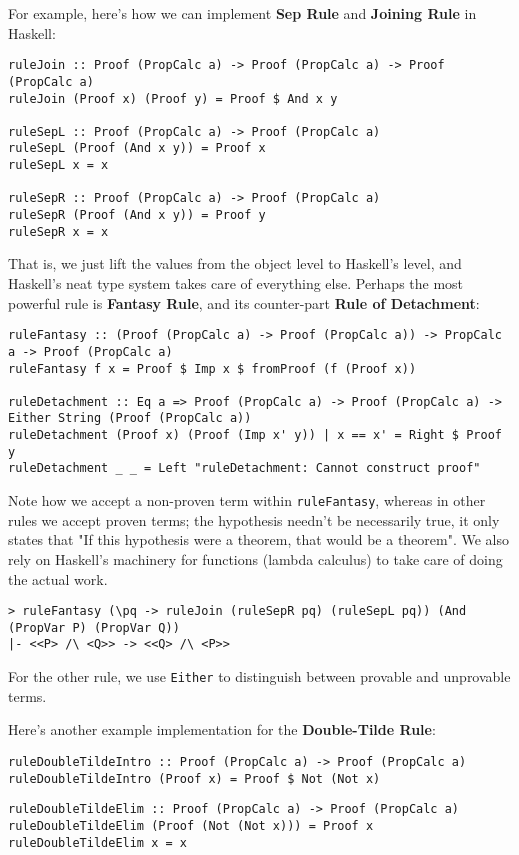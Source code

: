 \documentclass{article}
\begin{document}
For example, here's how we can implement \textbf{Sep Rule} and \textbf{Joining Rule} in Haskell:

\begin{lstlisting}
ruleJoin :: Proof (PropCalc a) -> Proof (PropCalc a) -> Proof (PropCalc a)
ruleJoin (Proof x) (Proof y) = Proof $ And x y

ruleSepL :: Proof (PropCalc a) -> Proof (PropCalc a)
ruleSepL (Proof (And x y)) = Proof x
ruleSepL x = x

ruleSepR :: Proof (PropCalc a) -> Proof (PropCalc a)
ruleSepR (Proof (And x y)) = Proof y
ruleSepR x = x
\end{lstlisting}

That is, we just lift the values from the object level to Haskell's level, and Haskell's neat type system takes care of everything else. Perhaps the most powerful rule is \textbf{Fantasy Rule}, and its counter-part \textbf{Rule of Detachment}:

\begin{lstlisting}
ruleFantasy :: (Proof (PropCalc a) -> Proof (PropCalc a)) -> PropCalc a -> Proof (PropCalc a)
ruleFantasy f x = Proof $ Imp x $ fromProof (f (Proof x))

ruleDetachment :: Eq a => Proof (PropCalc a) -> Proof (PropCalc a) -> Either String (Proof (PropCalc a))
ruleDetachment (Proof x) (Proof (Imp x' y)) | x == x' = Right $ Proof y
ruleDetachment _ _ = Left "ruleDetachment: Cannot construct proof"
\end{lstlisting}

Note how we accept a non-proven term within \texttt{ruleFantasy}, whereas in other rules we accept proven terms; the hypothesis needn't be necessarily true, it only states that "If this hypothesis were a theorem, that would be a theorem". We also rely on Haskell's machinery for functions (lambda calculus) to take care of doing the actual work.

\begin{lstlisting}
> ruleFantasy (\pq -> ruleJoin (ruleSepR pq) (ruleSepL pq)) (And (PropVar P) (PropVar Q))
|- <<P> /\ <Q>> -> <<Q> /\ <P>>
\end{lstlisting}

For the other rule, we use \texttt{Either} to distinguish between provable and unprovable terms.

Here's another example implementation for the \textbf{Double-Tilde Rule}:

\begin{minipage}{0.49\textwidth}
\begin{lstlisting}
ruleDoubleTildeIntro :: Proof (PropCalc a) -> Proof (PropCalc a)
ruleDoubleTildeIntro (Proof x) = Proof $ Not (Not x)
\end{lstlisting}
\end{minipage}
\begin{minipage}{0.49\textwidth}
\begin{lstlisting}
ruleDoubleTildeElim :: Proof (PropCalc a) -> Proof (PropCalc a)
ruleDoubleTildeElim (Proof (Not (Not x))) = Proof x
ruleDoubleTildeElim x = x
\end{lstlisting}
\end{minipage}
\end{document}
